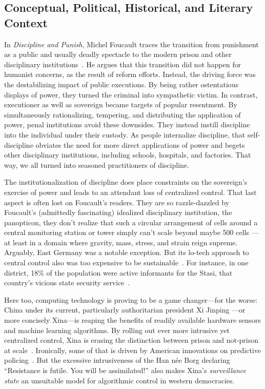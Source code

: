 \subsection{Conceptual, Political, Historical, and Literary Context}
\label{sec:context}

In \emph{Discipline and Punish}, Michel Foucault traces the transition from
punishment as a public and usually deadly spectacle to the modern prison and
other disciplinary institutions~\cite{Foucault1979}. He argues that this
transition did not happen for humanist concerns, as the result of reform
efforts. Instead, the driving force was the destabilizing impact of public
executions. By being rather ostentatious displays of power, they turned the
criminal into sympathetic victim. In contrast, executioner as well as sovereign
became targets of popular resentment. By simultaneously rationalizing,
tempering, and distributing the application of power, penal institutions avoid
these downsides. They instead instill discipline into the individual under their
custody. As people internalize discipline, that self-discipline obviates the
need for more direct applications of power and begets other disciplinary
institutions, including schools, hospitals, and factories. That way, we all
turned into seasoned practitioners of discipline.

The institutionalization of discipline does place constraints on the sovereign's
exercise of power and leads to an attendant loss of centralized control. That
last aspect is often lost on Foucault's readers. They are so razzle-dazzled by
Foucault's (admittedly fascinating) idealized disciplinary institution, the
panopticon, they don't realize that such a circular arrangement of cells around
a central monitoring station or tower simply can't scale beyond maybe 500 cells%
---at least in a domain where gravity, mass, stress, and strain reign supreme.
Arguably, East Germany was a notable exception. But its lo-tech approach to
central control also was too expensive to be sustainable~\cite{Schroeder2013}.
For instance, in one district, 18\% of the population were active informants for
the Stasi, that country's vicious state security service~\cite{Kellerhoff2022}.

Here too, computing technology is proving to be a game changer---for the
worse: China under its current, particularly authoritarian president Xi Jinping%
---or more concisely Xina---is reaping the benefits of readily available
hardware sensors and machine learning algorithms. By rolling out ever more
intrusive yet centralized control, Xina is erasing the distinction between
prison and not-prison at scale~\cite{Grauer2021,MozurXiaoea2022,SmithIV2016}.
Ironically, some of that is driven by American innovations on predictive
policing~\cite{PerryMcInnisea2013,SmithIV2016,Sprick2019}. But the excessive
intrusiveness of the Han n\'ee Borg declaring ``Resistance is futile. You will
be assimilated!'' also makes Xina's \emph{surveillance state} an unsuitable
model for algorithmic control in western democracies.

